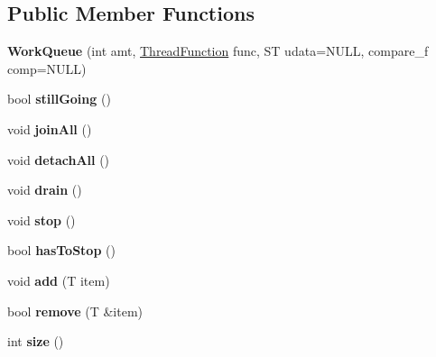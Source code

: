 \subsection*{Public Member Functions}
\begin{DoxyCompactItemize}
\item 
{\bfseries Work\+Queue} (int amt, \hyperlink{threading_8h_a4f750a8ce1d70e85989d1d5ae1a150b5}{Thread\+Function} func, ST udata=N\+U\+LL, compare\+\_\+f comp=N\+U\+LL)\hypertarget{class_work_queue_a83abb711bc4422cb9815178dbc86ce0e}{}\label{class_work_queue_a83abb711bc4422cb9815178dbc86ce0e}

\item 
bool {\bfseries still\+Going} ()\hypertarget{class_work_queue_a36382e6d17329eee9157ff9ff4a60a3d}{}\label{class_work_queue_a36382e6d17329eee9157ff9ff4a60a3d}

\item 
void {\bfseries join\+All} ()\hypertarget{class_work_queue_a52d740718b3d034c147d2bbe846ce71e}{}\label{class_work_queue_a52d740718b3d034c147d2bbe846ce71e}

\item 
void {\bfseries detach\+All} ()\hypertarget{class_work_queue_ad2df74f9396c388e001c7830af632899}{}\label{class_work_queue_ad2df74f9396c388e001c7830af632899}

\item 
void {\bfseries drain} ()\hypertarget{class_work_queue_ada316b8363d46f7479979994d7ad0eb6}{}\label{class_work_queue_ada316b8363d46f7479979994d7ad0eb6}

\item 
void {\bfseries stop} ()\hypertarget{class_work_queue_a7a7038296e55c02a8e66e3b1950640af}{}\label{class_work_queue_a7a7038296e55c02a8e66e3b1950640af}

\item 
bool {\bfseries has\+To\+Stop} ()\hypertarget{class_work_queue_a5b3b4a088b03424678032b9f41ec7a70}{}\label{class_work_queue_a5b3b4a088b03424678032b9f41ec7a70}

\item 
void {\bfseries add} (T item)\hypertarget{class_work_queue_a73a70d61549b7e4e0c5d7e8aed187b17}{}\label{class_work_queue_a73a70d61549b7e4e0c5d7e8aed187b17}

\item 
bool {\bfseries remove} (T \&item)\hypertarget{class_work_queue_aba21cbeed7a18e44729c2f3c43e89d3c}{}\label{class_work_queue_aba21cbeed7a18e44729c2f3c43e89d3c}

\item 
int {\bfseries size} ()\hypertarget{class_work_queue_ac2bf2d4acf6899c351ab280d18dcee0a}{}\label{class_work_queue_ac2bf2d4acf6899c351ab280d18dcee0a}


\end{DoxyCompactItemize}
